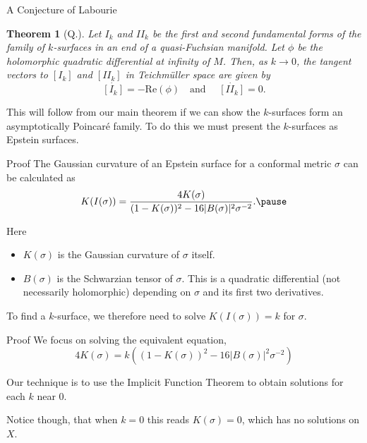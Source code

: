 \documentclass[professionalfont]{beamer}
\newtheorem{thm}{Theorem}[section]
\newcommand{\two}{I\!I}
\begin{document}
\begin{frame}{A Conjecture of Labourie}
 
\begin{thm}[Q.] \label{labourie-conjecture-proof}
Let $I_k$ and $\two_k$ be the first and second fundamental forms of the family of $k$-surfaces in an end of a quasi-Fuchsian manifold. 
Let $\phi$ be the holomorphic quadratic differential at infinity of $M$. 
Then, as $k \to 0$, the tangent vectors to $[I_k]$ and $[\two_k]$ in Teichm\"uller space are given by 
\[
\dot{[I_k]} = - \mathrm{Re}(\phi) \quad \text{and } \quad   \dot{[\two_k]} = 0.
\]
\end{thm} \pause

\vspace{0.5cm}

This will follow from our main theorem if we can show the $k$-surfaces form an asymptotically Poincar\'e family. To do this we must present the $k$-surfaces as Epstein surfaces.


\end{frame}




\begin{frame}{Proof}
The Gaussian curvature of an Epstein surface for a conformal metric $\sigma$ can be calculated as 
\[
K(I(\sigma)) = \frac{4K(\sigma)}{(1-K(\sigma))^2 - 16|B(\sigma)|^2\sigma^{-2}}. \pause
\]

Here 
\begin{itemize}

	\item $K(\sigma)$ is the Gaussian curvature of $\sigma$ itself. \pause
	
	\item $B(\sigma)$ is the Schwarzian tensor of $\sigma$. This is a quadratic differential (not necessarily holomorphic) depending on $\sigma$ and its first two derivatives. \pause

\end{itemize}

\vspace{0.5cm}

To find a $k$-surface, we therefore need to solve $K(I(\sigma)) = k$ for $\sigma$.
\newline


\end{frame}




\begin{frame}{Proof}
We focus on solving the equivalent equation,
\begin{equation}\tag{$\ast$}\label{k-surface-eqn}
4K(\sigma) = k \left((1-K(\sigma))^2 - 16|B(\sigma)|^2\sigma^{-2} \right)
\end{equation}  \pause

Our technique is to use the Implicit Function Theorem to obtain solutions for each $k$ near 0. 
\newline

Notice though, that when $k=0$ this reads $K(\sigma) = 0$, which has no solutions on $X$.


\end{frame}
\end{document}
